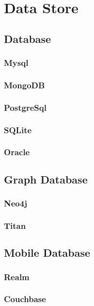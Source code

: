 \chapter{Data Store}\label{ch:ch6label}

\section{Database} 

\subsection{Mysql}
\subsection{MongoDB}
\subsection{PostgreSql}
\subsection{SQLite}
\subsection{Oracle}

\section{Graph Database}

\subsection{Neo4j}
\subsection{Titan}

\section{Mobile Database}

\subsection{Realm}
\subsection{Couchbase}

